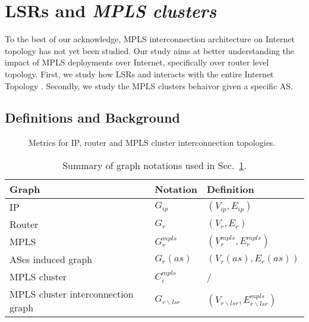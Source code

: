 \section{LSRs and \textit{MPLS clusters}}\label{cluster}
To the best of our acknowledge, MPLS interconnection architecture on Internet
topology has not yet been studied. Our study aims at better
understanding the impact of MPLS deployments over Internet, specifically over
router level topology. First, we study how LSRs and  
interacts  with the entire Internet Topology . Secondly, we
study the MPLS clusters behaivor given a specific AS.

\subsection{Definitions and Background}\label{cluster.methodo}
\begin{figure*}[!htb]
  \begin{center}
    \hfil
    \hfil
  \end{center}
\caption{Metrics for IP, router and MPLS cluster interconnection
topologies.} 
\label{fig_metrics}
\end{figure*}

\begin{table}[!t]
  \begin{center}
    \begin{tabular}{l|ll}
    \textbf{Graph} & \textbf{Notation} & \textbf{Definition}\\
    \hline
    IP                 & $G_{ip}$ & $(V_{ip}, E_{ip})$\\
    Router             & $G_r$ & $(V_r, E_r)$\\    
    MPLS               & $G_r^{mpls}$ & $(V_r^{mpls}, E_r^{mpls})$\\
    ASes induced graph & $G_r(as)$ & $(V_r(as), E_r(as))$\\    
    MPLS cluster       & $C_i^{mpls}$ & /\\
    MPLS cluster interconnection graph & $G_{r \backslash lsr}$ & $(V_{r
    \backslash lsr}, E_{r \backslash lsr}^{mpls})$
    \end{tabular}
  \end{center}
  \caption{Summary of graph notations used in Sec.~\ref{cluster}.}
  \label{cluster.table_notations}
\end{table}




